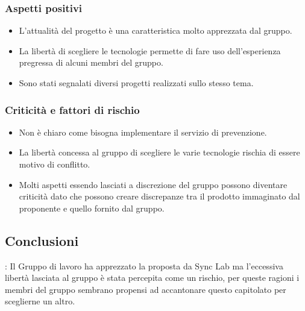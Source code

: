 		\subsubsection{Aspetti positivi}
			\begin{itemize}
				\item L’attualità del progetto è una caratteristica molto apprezzata dal gruppo.
				\item La libertà di scegliere le tecnologie permette di fare uso dell’esperienza pregressa di alcuni membri del gruppo.
				\item Sono stati segnalati diversi progetti realizzati sullo stesso tema.
			\end{itemize}
			
		\subsubsection{Criticità e fattori di rischio}
			\begin{itemize}
				\item Non è chiaro come bisogna implementare il servizio di prevenzione.
				\item La libertà concessa al gruppo di scegliere le varie tecnologie rischia di essere motivo di conflitto.
				\item Molti aspetti essendo lasciati a discrezione del gruppo possono diventare criticità dato che possono creare discrepanze tra il prodotto immaginato dal proponente e quello fornito dal gruppo.
			\end{itemize}
		\subsection{Conclusioni}:
			Il Gruppo di lavoro ha apprezzato la proposta da Sync Lab ma l’eccessiva libertà lasciata al gruppo è stata percepita come un rischio, per queste ragioni i membri del gruppo sembrano propensi ad accantonare questo capitolato per sceglierne un altro.
\newpage
				
				
				
				
				
				
				
				
				
				
				
				
				
				
				
				
				
				
				
				